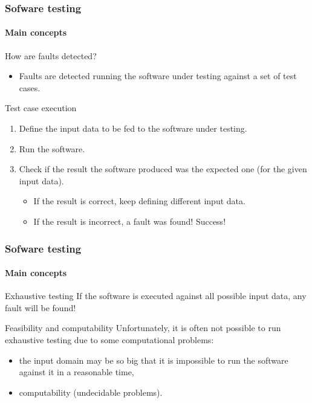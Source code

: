 \begin{frame}
\frametitle{Sofware testing}
\framesubtitle{Main concepts}

\begin{block:fact}{How are faults detected?}
\begin{itemize}
	\item Faults are detected running the software under testing against a set
	of test cases.
\end{itemize}
\end{block:fact}

\begin{block:procedure}{Test case execution}
\begin{enumerate}
	\item Define the input data to be fed to the software under testing.

	\item Run the software.

	\item Check if the result the software produced was the expected one (for
	the given input data).
	\begin{itemize}
		\item If the result is correct, keep defining different input data.

		\item If the result is incorrect, a fault was found! Success!
	\end{itemize}
\end{enumerate}
\end{block:procedure}
\end{frame}



\begin{frame}
\frametitle{Sofware testing}
\framesubtitle{Main concepts}

\begin{block:principle}{Exhaustive testing}
If the software is executed against all possible input data,
any fault will be found!
\end{block:principle}

\begin{block:fact}{Feasibility and computability}
Unfortunately, it is often not possible to run exhaustive testing due to
some computational problems:
\begin{itemize}
	\item the input domain may be so big that it is impossible to run the
	software against it in a reasonable time,

	\item computability (undecidable problems).
\end{itemize}
\end{block:fact}
\end{frame}


